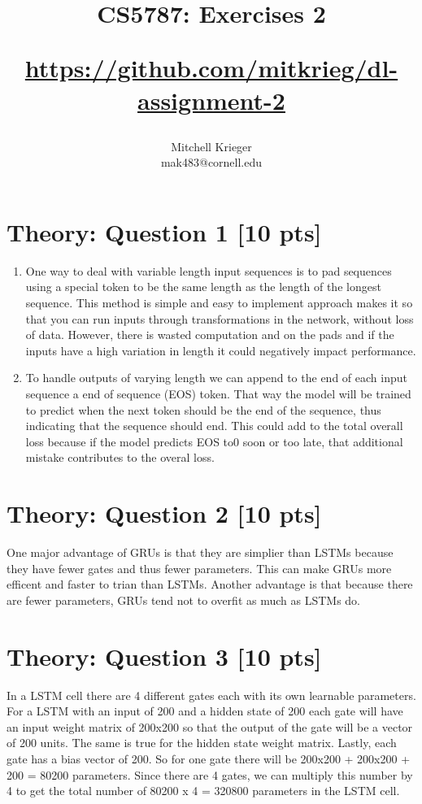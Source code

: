 \documentclass{article}
\title{CS5787: Exercises 2 \\ \begin{small}\url{https://github.com/mitkrieg/dl-assignment-2}\end{small}}
\author{Mitchell Krieger \\ mak483@cornell.edu}
\date{}
\begin{document}
\maketitle

\section{Theory: Question 1 [10 pts]}

\begin{enumerate}[label=\alph*)]
    \item One way to deal with variable length input sequences is to pad sequences using a special token to be the same length as the length of the longest sequence. This method is simple and easy to implement approach makes it so that you can run inputs through transformations in the network, without loss of data. However, there is wasted computation and on the pads and if the inputs have a high variation in length it could negatively impact performance.
    \item To handle outputs of varying length we can append to the end of each input sequence a end of sequence (EOS) token. That way the model will be trained to predict when the next token should be the end of the sequence, thus indicating that the sequence should end. This could add to the total overall loss because if the model predicts EOS to0 soon or too late, that additional mistake contributes to the overal loss. 
\end{enumerate}

\section{Theory: Question 2 [10 pts]}

One major advantage of GRUs is that they are simplier than LSTMs because they have fewer gates and thus fewer parameters. This can make GRUs more efficent and faster to trian than LSTMs. Another advantage is that because there are fewer parameters, GRUs tend not to overfit as much as LSTMs do. 

\section{Theory: Question 3 [10 pts]}

In a LSTM cell there are 4 different gates each with its own learnable parameters. For a LSTM with an input of 200 and a hidden state of 200 each gate will have an input weight matrix of 200x200 so that the output of the gate will be a vector of 200 units. The same is true for the hidden state weight matrix. Lastly, each gate has a bias vector of 200. So for one gate there will be 200x200 + 200x200 + 200 = 80200 parameters. Since there are 4 gates, we can multiply this number by 4 to get the total number of 80200 x 4 = 320800 parameters in the LSTM cell.
\end{document}
